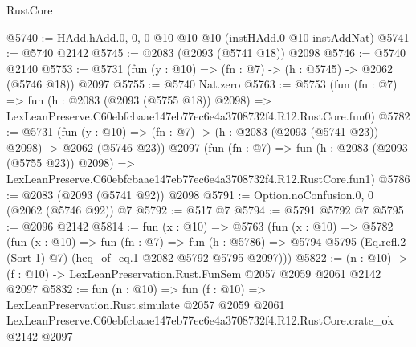\begin{lexlean}{RustCore}
\begin{coremodule}
@5740 := HAdd.hAdd.{0, 0, 0} @10 @10 @10 (instHAdd.{0} @10 instAddNat)
@5741 := @5740 @2142
@5745 := @2083 (@2093 (@5741 @18)) @2098
@5746 := @5740 @2140
@5753 := @5731 (fun (y : @10) => (fn : @7) -> (h : @5745) -> @2062 (@5746 @18)) @2097
@5755 := @5740 Nat.zero
@5763 := @5753
    (fun (fn : @7) =>
    fun (h : @2083 (@2093 (@5755 @18)) @2098) =>
    LexLeanPreserve.C60ebfcbaae147eb77ec6e4a3708732f4.R12.RustCore.fun0)
@5782 := @5731
    (fun (y : @10) => (fn : @7) -> (h : @2083 (@2093 (@5741 @23)) @2098) -> @2062 (@5746 @23))
    @2097
    (fun (fn : @7) =>
    fun (h : @2083 (@2093 (@5755 @23)) @2098) =>
    LexLeanPreserve.C60ebfcbaae147eb77ec6e4a3708732f4.R12.RustCore.fun1)
@5786 := @2083 (@2093 (@5741 @92)) @2098
@5791 := Option.noConfusion.{0, 0} (@2062 (@5746 @92)) @7
@5792 := @517 @7
@5794 := @5791 @5792 @7
@5795 := @2096 @2142
@5814 := fun (x : @10) =>
  @5763
    (fun (x : @10) =>
    @5782
      (fun (x : @10) =>
      fun (fn : @7) =>
      fun (h : @5786) =>
      @5794 @5795 (Eq.refl.{2} (Sort 1) @7) (heq_of_eq.{1} @2082 @5792 @5795 @2097)))
@5822 := (n : @10) -> (f : @10) -> LexLeanPreservation.Rust.FunSem @2057 @2059 @2061 @2142 @2097
@5832 := fun (n : @10) =>
  fun (f : @10) =>
  LexLeanPreservation.Rust.simulate
    @2057
    @2059
    @2061
    LexLeanPreserve.C60ebfcbaae147eb77ec6e4a3708732f4.R12.RustCore.crate_ok
    @2142
    @2097
\end{coremodule}
\end{lexlean}

